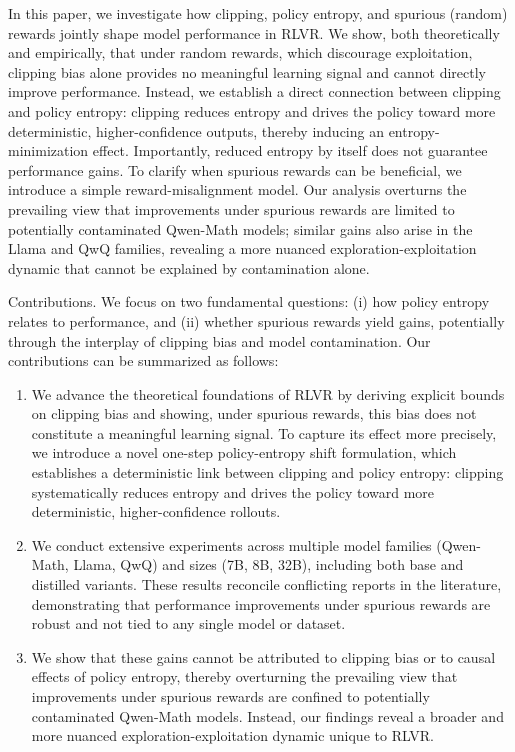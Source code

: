 \documentclass[
  10
]{article}
\begin{document}
In this paper, we investigate how clipping, policy entropy, and spurious
(random) rewards jointly shape model performance in RLVR. We show, both
theoretically and empirically, that under random rewards, which
discourage exploitation, clipping bias alone provides no meaningful
learning signal and cannot directly improve performance. Instead, we
establish a direct connection between clipping and policy entropy:
clipping reduces entropy and drives the policy toward more
deterministic, higher-confidence outputs, thereby inducing an
entropy-minimization effect. Importantly, reduced entropy by itself does
not guarantee performance gains. To clarify when spurious rewards can be
beneficial, we introduce a simple reward-misalignment model. Our
analysis overturns the prevailing view that improvements under spurious
rewards are limited to potentially contaminated Qwen-Math models;
similar gains also arise in the Llama and QwQ families, revealing a more
nuanced exploration-exploitation dynamic that cannot be explained by
contamination alone.

Contributions. We focus on two fundamental questions: (i) how policy
entropy relates to performance, and (ii) whether spurious rewards yield
gains, potentially through the interplay of clipping bias and model
contamination. Our contributions can be summarized as follows:

\begin{enumerate}
\def\labelenumi{\arabic{enumi}.}
\item
  We advance the theoretical foundations of RLVR by deriving explicit
  bounds on clipping bias and showing, under spurious rewards, this bias
  does not constitute a meaningful learning signal. To capture its
  effect more precisely, we introduce a novel one-step policy-entropy
  shift formulation, which establishes a deterministic link between
  clipping and policy entropy: clipping systematically reduces entropy
  and drives the policy toward more deterministic, higher-confidence
  rollouts.
\item
  We conduct extensive experiments across multiple model families
  (Qwen-Math, Llama, QwQ) and sizes (7B, 8B, 32B), including both base
  and distilled variants. These results reconcile conflicting reports in
  the literature, demonstrating that performance improvements under
  spurious rewards are robust and not tied to any single model or
  dataset.
\item
  We show that these gains cannot be attributed to clipping bias or to
  causal effects of policy entropy, thereby overturning the prevailing
  view that improvements under spurious rewards are confined to
  potentially contaminated Qwen-Math models. Instead, our findings
  reveal a broader and more nuanced exploration-exploitation dynamic
  unique to RLVR.
\end{enumerate}
\end{document}
